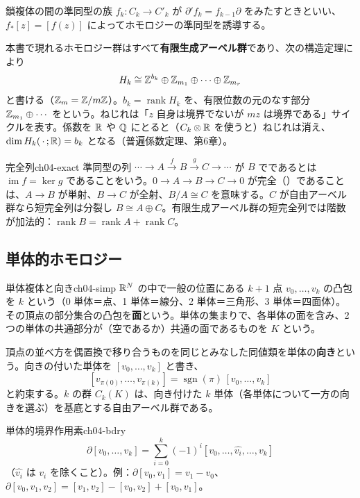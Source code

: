 鎖複体の間の準同型の族 $f_k\colon C_k\to C'_k$ が $\partial'f_k=f_{k-1}\partial$ をみたすときといい、$f_*[z]=[f(z)]$ によってホモロジーの準同型を誘導する。

本書で現れるホモロジー群はすべて\textbf{有限生成アーベル群}であり、次の構造定理により
\[
H_k\cong\mathbb{Z}^{b_k}\oplus\mathbb{Z}_{m_1}\oplus\cdots\oplus\mathbb{Z}_{m_r}
\]
と書ける（$\mathbb{Z}_m=\mathbb{Z}/m\mathbb{Z}$）。$b_k=\operatorname{rank}H_k$ を、有限位数の元のなす部分 $\mathbb{Z}_{m_1}\oplus\cdots$ をという。ねじれは「$z$ 自身は境界でないが $mz$ は境界である」サイクルを表す。係数を $\mathbb{R}$ や $\mathbb{Q}$ にとると（$C_k\otimes\mathbb{R}$ を使うと）ねじれは消え、$\dim H_k(\,\cdot\,;\mathbb{R})=b_k$ となる（普遍係数定理、第6章）。

\begin{mydef}{完全列}{ch04-exact}
準同型の列 $\cdots\to A\xrightarrow{f}B\xrightarrow{g}C\to\cdots$ が $B$ でであるとは $\operatorname{im}f=\ker g$ であることをいう。$0\to A\to B\to C\to0$ が完全（）であることは、$A\to B$ が単射、$B\to C$ が全射、$B/A\cong C$ を意味する。$C$ が自由アーベル群なら短完全列は分裂し $B\cong A\oplus C$。有限生成アーベル群の短完全列では階数が加法的：$\operatorname{rank}B=\operatorname{rank}A+\operatorname{rank}C$。
\end{mydef}

\subsection{単体的ホモロジー}

\begin{mydef}{単体複体と向き}{ch04-simp}
$\mathbb{R}^N$ の中で一般の位置にある $k+1$ 点 $v_0,\dots,v_k$ の凸包を $k$  という（0 単体＝点、1 単体＝線分、2 単体＝三角形、3 単体＝四面体）。その頂点の部分集合の凸包を\textbf{面}という。単体の集まりで、各単体の面を含み、2つの単体の共通部分が（空であるか）共通の面であるものを $K$ という。

頂点の並べ方を偶置換で移り合うものを同じとみなした同値類を単体の\textbf{向き}という。向きの付いた単体を $[v_0,\dots,v_k]$ と書き、
\[
[v_{\pi(0)},\dots,v_{\pi(k)}]=\operatorname{sgn}(\pi)\,[v_0,\dots,v_k]
\]
と約束する。$k$  の群 $C_k(K)$ は、向き付けた $k$ 単体（各単体について一方の向きを選ぶ）を基底とする自由アーベル群である。
\end{mydef}

\begin{mydef}{単体的境界作用素}{ch04-bdry}
\[
\partial[v_0,\dots,v_k]=\sum_{i=0}^k(-1)^i[v_0,\dots,\widehat{v_i},\dots,v_k]
\]
（$\widehat{v_i}$ は $v_i$ を除くこと）。例：$\partial[v_0,v_1]=v_1-v_0$、$\partial[v_0,v_1,v_2]=[v_1,v_2]-[v_0,v_2]+[v_0,v_1]$。
\end{mydef}

